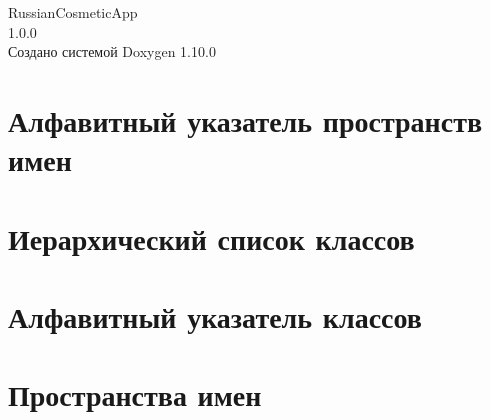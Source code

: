 \documentclass[twoside]{book}
\newcommand{\+}{\discretionary{\mbox{\scriptsize$\hookleftarrow$}}{}{}}
\newcommand{\clearemptydoublepage}{%
    \newpage{\pagestyle{empty}\cleardoublepage}%
  }
\begin{document}
  \raggedbottom
    \hypersetup{pageanchor=false,
                bookmarksnumbered=true,
                pdfencoding=unicode
               }
  \begin{titlepage}
  \vspace*{7cm}
  \begin{center}%
  {\Large Russian\+Cosmetic\+App}\\
  [1ex]\large 1.\+0.\+0 \\
  \vspace*{1cm}
  {\large Создано системой Doxygen 1.10.0}\\
  \end{center}
  \end{titlepage}
  \clearemptydoublepage
  \tableofcontents
  \clearemptydoublepage
  \hypersetup{pageanchor=true}


\chapter{Алфавитный указатель пространств имен}

\chapter{Иерархический список классов}

\chapter{Алфавитный указатель классов}

\chapter{Пространства имен}







\end{document}
